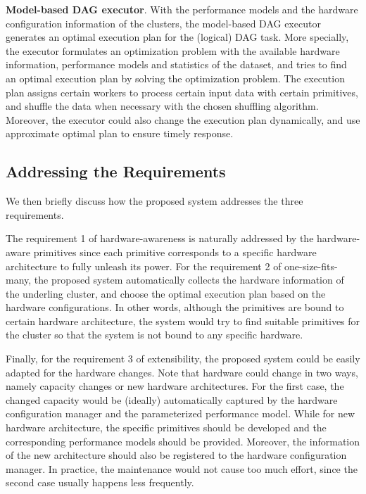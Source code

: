 \documentclass[conference]{llncs}
\newcommand{\zap}[1]{ }
\begin{document}
\textbf{Model-based DAG executor}.
With the performance models and the hardware configuration information of the clusters, the model-based DAG executor generates an optimal execution plan for the (logical) DAG task.
More specially, the executor formulates an optimization problem with the available hardware information, performance models and statistics of the dataset, and tries to find an optimal execution plan by solving the optimization problem.
The execution plan assigns certain workers to process certain input data with certain primitives, and shuffle the data when necessary with the chosen shuffling algorithm.
Moreover, the executor could also change the execution plan dynamically, and use approximate optimal plan to ensure timely response.

\zap{
With the architectural design, each query is processed as follows.
We assume each query is represented as a logical DAG task.
The DAG executor checks the hardware configuration of the cluster to determine the suitable data processing primitives, and formulate an optimization problem to determine the optimal execution plan.
With the execution plan, the executor assigns certain workers to process each DAG node with the chosen primitives, and shuffles data with the chosen shuffling algorithm when necessary.
}

\subsection{Addressing the Requirements}
We then briefly discuss how the proposed system addresses the three requirements.

The requirement 1 of hardware-awareness is naturally addressed by the hardware-aware primitives since each primitive corresponds to a specific hardware architecture to fully unleash its power.
For the requirement 2 of one-size-fits-many, the proposed system automatically collects the hardware information of the underling cluster, and choose the optimal execution plan based on the hardware configurations.
In other words, although the primitives are bound to certain hardware architecture, the system would try to find suitable primitives for the cluster so that the system is not bound to any specific hardware.

Finally, for the requirement 3 of extensibility, the proposed system could be easily adapted for the hardware changes.
Note that hardware could change in two ways, namely capacity changes or new hardware architectures.
For the first case, the changed capacity would be (ideally) automatically captured by the hardware configuration manager and the parameterized performance model.
While for new hardware architecture, the specific primitives should be developed and the corresponding performance models should be provided.
Moreover, the information of the new architecture should also be registered to the hardware configuration manager.
In practice, the maintenance would not cause too much effort, since the second case usually happens less frequently.
\end{document}
